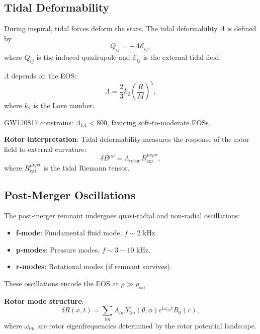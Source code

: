 \documentclass[12pt,a4paper]{article}
\theoremstyle{definition}
\theoremstyle{remark}
\begin{document}
\subsection{Tidal Deformability}

During inspiral, tidal forces deform the stars. The tidal deformability $\Lambda$ is defined by
\begin{equation}
Q_{ij} = -\Lambda \mathcal{E}_{ij},
\end{equation}
where $Q_{ij}$ is the induced quadrupole and $\mathcal{E}_{ij}$ is the external tidal field.

$\Lambda$ depends on the EOS:
\begin{equation}
\Lambda = \frac{2}{3} k_2 \left(\frac{R}{M}\right)^5,
\end{equation}
where $k_2$ is the Love number.

GW170817 constrains: $\Lambda_{1.4} < 800$, favoring soft-to-moderate EOSs.

\textbf{Rotor interpretation}: Tidal deformability measures the response of the rotor field to external curvature:
\begin{equation}
\delta B^{\mu\nu} = \Lambda_{\text{rotor}} \, R^{\mu\nu\rho\sigma}_{\text{ext}},
\end{equation}
where $R^{\mu\nu\rho\sigma}_{\text{ext}}$ is the tidal Riemann tensor.

\subsection{Post-Merger Oscillations}

The post-merger remnant undergoes quasi-radial and non-radial oscillations:
\begin{itemize}
\item \textbf{f-mode}: Fundamental fluid mode, $f \sim 2$ kHz.
\item \textbf{p-modes}: Pressure modes, $f \sim 3-10$ kHz.
\item \textbf{r-modes}: Rotational modes (if remnant survives).
\end{itemize}

These oscillations encode the EOS at $\rho \gg \rho_{\text{sat}}$.

\textbf{Rotor mode structure}:
\begin{equation}
\delta R(x,t) = \sum_{lm} A_{lm} Y_{lm}(\theta,\phi) e^{i\omega_{lm} t} R_0(r),
\end{equation}
where $\omega_{lm}$ are rotor eigenfrequencies determined by the rotor potential landscape.
\end{document}
